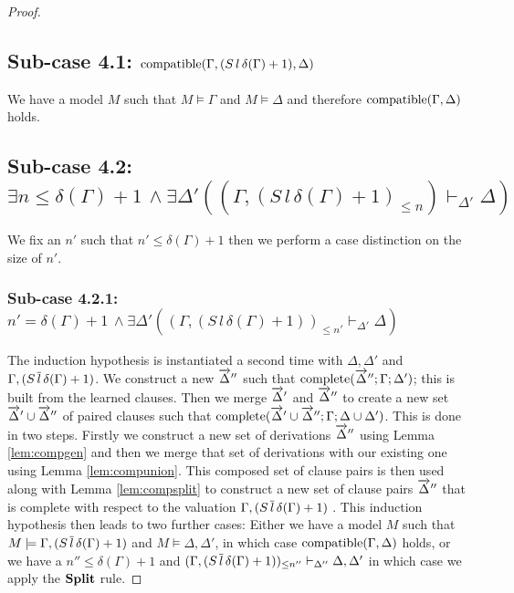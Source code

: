 \begin{mytheorem}
\begin{proof}
\subsection*{Sub-case 4.1: $\mathrm{compatible}(\Gamma, (S \, l \, \delta(\Gamma) + 1),\Delta)$}
We have a model $M$ such that $M \models \Gamma$ and $M \models \Delta$ and therefore $\mathrm{compatible}(\Gamma,\Delta)$ holds.
%
\subsection*{Sub-case 4.2: $ \exists n \leq \delta(\Gamma) + 1 \, \wedge  \exists \Delta' ( (\Gamma, (S \, l \, \delta(\Gamma) + 1)_{ \leq n})  \vdash_{\Delta'} \Delta)$}
We fix an $n'$ such that $n' \leq \delta(\Gamma) + 1$ then we perform a case distinction on the size of $n'$.
%
\subsubsection*{Sub-case 4.2.1: $  n' = \delta(\Gamma) + 1 \, \wedge  \exists \Delta' ( (\Gamma, (S \,  l \, \delta(\Gamma) + 1)) _{\leq n'}  \vdash_{\Delta'} \Delta)$}
The induction hypothesis is instantiated a second time with $\Delta, \Delta'$ and $\Gamma, (S \,  \overline{l} \, \delta(\Gamma) + 1)$. We construct a new $\overrightarrow{\Delta}''$ such that $\mathrm{complete}(\overrightarrow{\Delta}'';\Gamma; \Delta')$; this is built from the learned clauses. Then we merge $\overrightarrow{\Delta}'$ and $\overrightarrow{\Delta}''$ to create a new set $\overrightarrow{\Delta}' \cup \overrightarrow{\Delta}''$ of paired clauses such that $\mathrm{complete}(\overrightarrow{\Delta}' \cup \overrightarrow{\Delta}'';\Gamma; \Delta \cup \Delta')$. This is done in two steps. Firstly we construct a new set of derivations $\overrightarrow{\Delta}''$ using Lemma \ref{lem:compgen} and then we merge that set of derivations with our existing one using Lemma \ref{lem:compunion}. This composed set of clause pairs is then used  along with Lemma \ref{lem:compsplit} to construct a new set of clause pairs $\overrightarrow{\Delta}''$ that is complete with respect to the valuation $\Gamma, (S \, \overline{l} \, \delta(\Gamma) + 1)$ .  This induction hypothesis then leads to two further cases: Either we have a model $M$ such that $M \models \Gamma,(S \, \overline{l} \, \delta(\Gamma) + 1)$ and $M \models \Delta, \Delta'$, in which case $\mathrm{compatible}(\Gamma,\Delta)$ holds, or we have a $n'' \leq \delta(\Gamma) + 1$ and $(\Gamma,(S \, \overline{l} \, \delta(\Gamma) + 1))_{\leq n''} \vdash_{\Delta''} \Delta, \Delta'$ in which case we apply the $\mathbf{Split}$ rule.
\begin{comment}
\textbf{We need to know that all of the learned clauses in $\Delta'$ are derivable from $\Gamma$ and $\Delta$ otherwise they are useless as the $\Conflict$ could not be applied to them. We know that they can be derived from some $\Gamma$ and $\Delta$ but how do we know that they are derivable from the current $\Gamma$ since it could be the case that backtracking has occurred and there is now a smaller $\Gamma$.}
\end{comment}
%

\end{proof}
\end{mytheorem}

